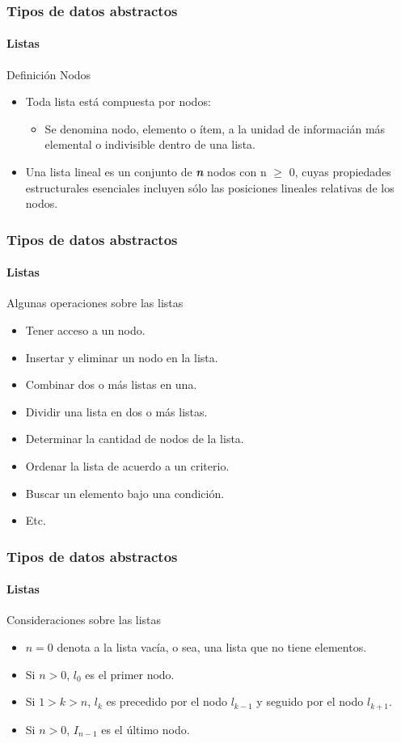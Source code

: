 \documentclass{beamer}
\begin{document}
		\begin{frame}
			\frametitle{Tipos de datos abstractos}
			\framesubtitle{Listas}

			\begin{block}{Definici\'on Nodos}
				\begin{itemize}
					\item Toda lista est\'a compuesta por nodos:
					\begin{itemize}
						\item Se denomina nodo, elemento o \'item, a la unidad de informaci\'an m\'as elemental o indivisible dentro de una lista.
					\end{itemize}
					\item Una lista lineal es un conjunto de {\em \textbf{n}} nodos con n $\geq$ 0, cuyas propiedades estructurales esenciales incluyen s\'olo las posiciones lineales relativas de los nodos.
				\end{itemize}
			\end{block}
		\end{frame}

		\begin{frame}
			\frametitle{Tipos de datos abstractos}
			\framesubtitle{Listas}

			\begin{block}{Algunas operaciones sobre las listas}
				\begin{itemize}
					\item Tener acceso a un nodo.
					\item Insertar y eliminar un nodo en la lista.
					\item Combinar dos o m\'as listas en una.
					\item Dividir una lista en dos o m\'as listas.
					\item Determinar la cantidad de nodos de la lista.
					\item Ordenar la lista de acuerdo a un criterio.
					\item Buscar un elemento bajo una condici\'on.
					\item Etc.
				\end{itemize}
			\end{block}
		\end{frame}

		\begin{frame}
			\frametitle{Tipos de datos abstractos}
			\framesubtitle{Listas}

			\begin{block}{Consideraciones sobre las listas}
				\begin{itemize}
					\item $n = 0$ denota a la lista vac\'ia, o sea, una lista que no tiene elementos.
					\item Si $n > 0$, $l_{0}$ es el primer nodo.
					\item Si $1 > k > n$, $l_{k}$ es precedido por el nodo $l_{k-1}$ y seguido por el nodo $l_{k+1}$.
					\item Si $n > 0$, $I_{n-1}$ es el \'ultimo nodo.
				\end{itemize}
			\end{block}
		\end{frame}
		
\end{document}
